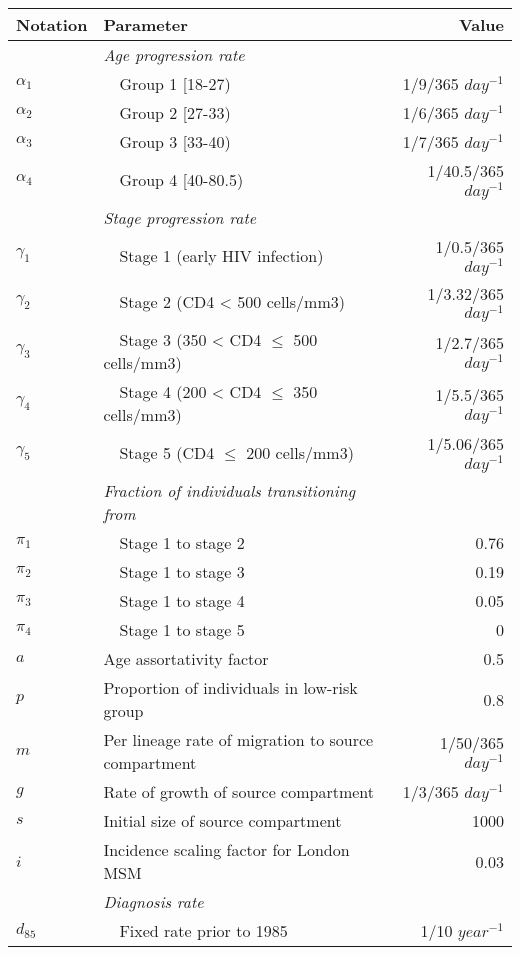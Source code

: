 	\begin{threeparttable}						
	\begin{tabular}{llr} %
	\toprule						
	Notation		&	Parameter	&	Value	\\
	\midrule						
			&	\emph{Age progression rate} \tnote{a}	&		\\
$	\alpha_1	$	&	~~Group 1 [18-27)	&	1/9/365 $day^{-1}$	\\
$	\alpha_2	$	&	~~Group 2 [27-33)	&	1/6/365 $day^{-1}$	\\
$	\alpha_3	$	&	~~Group 3 [33-40)	&	1/7/365 $day^{-1}$	\\
$	\alpha_4	$	&	~~Group 4 [40-80.5)	&	1/40.5/365 $day^{-1}$	\\
			&	\emph{Stage progression rate}\tnote{b}	&		\\
$	\gamma_1	$	&	~~Stage 1 (early HIV infection) 	&	1/0.5/365 $day^{-1}$	\\
$	\gamma_2	$	&	~~Stage 2 (CD4 < 500 cells/mm3)	&	1/3.32/365 $day^{-1}$	\\
$	\gamma_3	$	&	~~Stage 3 (350 < CD4 $\leq$ 500 cells/mm3)	&	1/2.7/365 $day^{-1}$	\\
$	\gamma_4	$	&	~~Stage 4 (200 < CD4 $\le$ 350 cells/mm3)	&	1/5.5/365 $day^{-1}$	\\
$	\gamma_5	$	&	~~Stage 5 (CD4 $\leq$ 200 cells/mm3)	&	1/5.06/365 $day^{-1}$	\\
			&	\emph{Fraction of individuals transitioning from} \tnote{b}	&		\\
$	\pi_1	$	&	~~Stage 1 to stage 2 	&	0.76	\\
$	\pi_2	$	&	~~Stage 1 to stage 3	&	0.19	\\
$	\pi_3	$	&	~~Stage 1 to stage 4	&	0.05	\\
$	\pi_4	$	&	~~Stage 1 to stage 5	&	0	\\
$	a	$	&	Age assortativity factor \tnote{c}	&	0.5	\\
$	p	$	&	Proportion of individuals in low-risk group	&	0.8	\\
$	m	$	&	Per lineage rate of migration to source compartment	&	1/50/365 $day^{-1}$	\\
$	g	$	&	Rate of growth of source compartment	&	1/3/365 $day^{-1}$	\\
$	s	$	&	Initial size of source compartment	&	1000	\\
$	i	$	&	Incidence scaling factor for London MSM \tnote{d}	&	0.03	\\
			&	\emph{Diagnosis rate}	&		\\
$	d_{85}	$	&	~~Fixed rate prior to 1985	&	1/10 $year^{-1}$	\\

\end{tabular}
\end{threeparttable}
